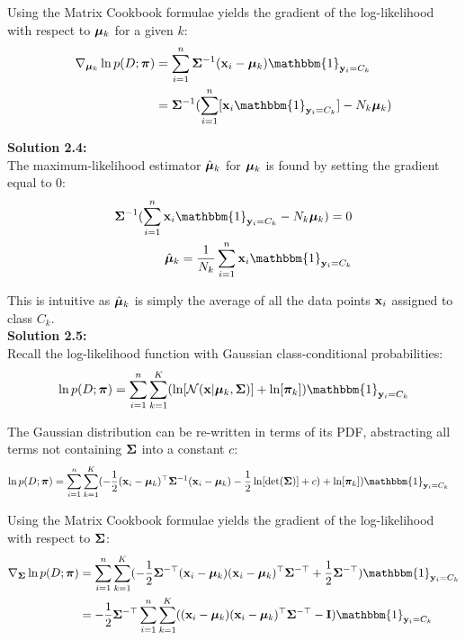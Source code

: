 \documentclass[submit]{harvardml}
\begin{document}
Using the Matrix Cookbook formulae yields the gradient of the log-likelihood with respect to $\boldsymbol{\mu}_k$ for a given $k$:
\begin{align*}
    \nabla_{\bmu_k} \ln p(D ; \bpi) &= \sum_{i=1}^{n} \bSigma^{-1} (\boldx_i - \bmu_k) \mathbbm{1}_{\boldy_i = C_k}\\
    &= \bSigma^{-1}  (\sum_{i=1}^{n} [\boldx_i \mathbbm{1}_{\boldy_i = C_k}] - N_k \bmu_k)
\end{align*}

\noindent\textbf{Solution 2.4:}\\
The maximum-likelihood estimator $\hat {\boldsymbol{\mu}}_k$ for $\boldsymbol{\mu}_k$ is found by setting the gradient equal to 0:
\begin{align*}
    \bSigma^{-1}  (\sum_{i=1}^{n} \boldx_i \mathbbm{1}_{\boldy_i = C_k} - N_k \bmu_k) = 0\\
    \hat \bmu_k = \frac{1}{N_k} \sum_{i=1}^{n} \boldx_i \mathbbm{1}_{\boldy_i = C_k}\\
\end{align*}

This is intuitive as $\hat {\boldsymbol{\mu}}_k$ is simply the average of all the data points $\mathbf{x}_i$ assigned to class $C_k$.\\

\noindent\textbf{Solution 2.5:}\\
Recall the log-likelihood function with Gaussian class-conditional probabilities:
\begin{align*}
    \ln p(D ; \bpi) &= \sum_{i=1}^{n} \sum_{k=1}^{K} (\ln[\mathcal{N}(\boldx |  \bmu_k, \bSigma)] + \ln[\bpi_k]) \mathbbm{1}_{\boldy_i = C_k}\\
\end{align*}

The Gaussian distribution can be re-written in terms of its PDF, abstracting all terms not containing $\mathbf{\Sigma}$ into a constant $c$:
\begin{align*}
    \ln p(D ; \bpi) &= \sum_{i=1}^{n} \sum_{k=1}^{K} (-\frac{1}{2} (\boldx_i - \bmu_k)^{\top} \bSigma^{-1}(\boldx_i - \bmu_k) - \frac{1}{2} \ln[\det(\bSigma)] + c) + \ln[\bpi_k]) \mathbbm{1}_{\boldy_i = C_k}
\end{align*}

Using the Matrix Cookbook formulae yields the gradient of the log-likelihood with respect to $\mathbf{\Sigma}$:
\begin{align*}
    \nabla_{\bSigma} \ln p(D ; \bpi) &= \sum_{i=1}^{n} \sum_{k=1}^{K} (- \frac{1}{2} \bSigma^{-\top} (\boldx_i - \bmu_k)(\boldx_i - \bmu_k)^{\top}\bSigma^{-\top} + \frac{1}{2} \bSigma^{-\top}) \mathbbm{1}_{\boldy_i = C_k}\\
    &= - \frac{1}{2} \bSigma^{-\top} \sum_{i=1}^{n} \sum_{k=1}^{K} ((\boldx_i - \bmu_k)(\boldx_i - \bmu_k)^{\top}\bSigma^{-\top} - \boldI) \mathbbm{1}_{\boldy_i = C_k}\\
\end{align*}
\end{document}
